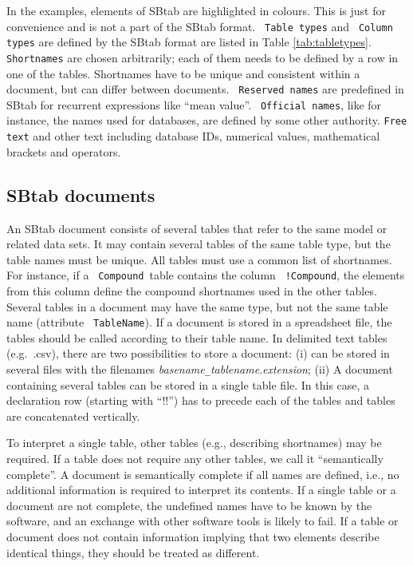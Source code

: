 \documentclass[a4paper]{article}
\newcommand{\la}[1]{}
\newcommand{\tab}[1]{{\texttt{\color{red} #1}}}
\newcommand{\col}[1]{\texttt{\color{blue} #1}}
\newcommand{\defext}[1] {\texttt{\color{lightblue} #1}}
\newcommand{\defint}[1] {\texttt{\color{darkgreen} #1}}
\newcommand{\nick}[1] {\texttt{\color{lila} #1}}
\begin{document}
In the examples, elements of SBtab are highlighted in colours.  This
is just for convenience and is not a part of the SBtab format.
\tab{Table types} and \col{Column types} are defined by the SBtab
format are listed in Table
\ref{tab:tabletypes}.  \nick{Shortnames} are chosen arbitrarily; each
of them needs to be defined by a row in one of the tables.  Shortnames
have to be unique and consistent within a document, but can differ
between documents.  \defint{Reserved names} are predefined in SBtab
for recurrent expressions like ``mean value''.  \defext{Official
  names}, like for instance, the names used for databases, are defined
by some other authority.  \texttt{Free text} and other text including
database IDs, numerical values, mathematical brackets and operators.

\subsection{SBtab documents}

An SBtab document consists of several tables that refer to the same
model or related data sets. It may contain several tables of the same
table type, but the table names must be unique.  All tables must use a
common list of shortnames.  For instance, if a \tab{Compound}\, table
contains the column \col{!Compound}, the elements from this column
define the compound shortnames used in the other tables.  Several
tables in a document may have the same type, but not the same table
name (attribute \tab{TableName}).  If a document is stored in a
spreadsheet file, the tables should be called according to their table
name.  In delimited text tables (e.g.~.csv), there are two
possibilities to store a document: (i) can be stored in several files
with the filenames
\emph{basename}\texttt{\_}\emph{tablename}.\emph{extension};
(ii) A document containing several tables can be stored in a single 
table file. In this case, a declaration row (starting with ``!!'')  
has to precede each of the tables and tables are concatenated vertically.

To interpret a single table, other tables (e.g., describing
shortnames) may be required.  If a table does not require any other
tables, we call it ``semantically complete''. A document is
semantically complete if all names are defined, i.e., no additional
information is required to interpret its contents.  If a single table
or a document are not complete, the undefined names have to be known
by the software, and an exchange with other software tools is likely
to fail.  \la{Different IDs or names for the same elements have to
 agree, otherwise the parser will throw an error.} 
If a table or
document does not contain information implying that two elements
describe identical things, they should be treated as different.
\end{document}
